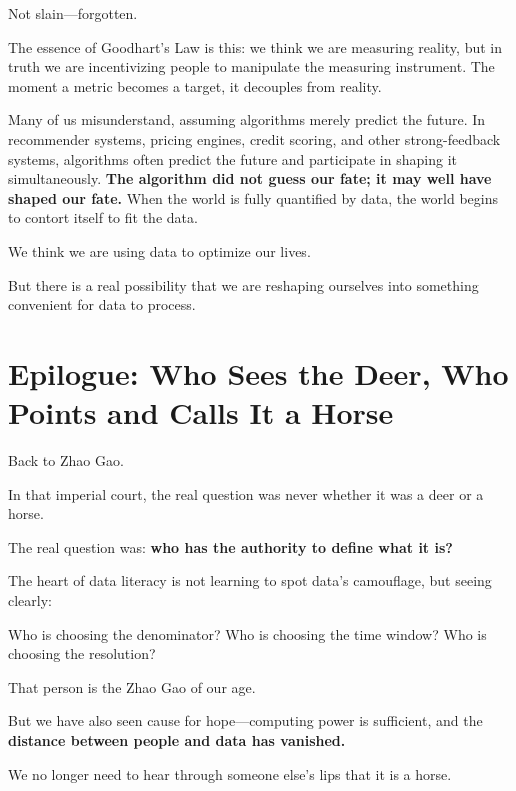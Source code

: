 \vspace{1em}

Not slain---forgotten.

The essence of Goodhart's Law is this: we think we are measuring reality, but in truth we are incentivizing people to manipulate the measuring instrument.
The moment a metric becomes a target, it decouples from reality.

\vspace{1em}

Many of us misunderstand, assuming algorithms merely predict the future.
In recommender systems, pricing engines, credit scoring, and other strong-feedback systems, algorithms often predict the future and participate in shaping it simultaneously.
\textbf{The algorithm did not guess our fate; it may well have shaped our fate.}
When the world is fully quantified by data, the world begins to contort itself to fit the data.

\begin{thinkbox}
We think we are using data to optimize our lives.

But there is a real possibility that we are reshaping ourselves into something convenient for data to process.
\end{thinkbox}

\newpage
\section{Epilogue: Who Sees the Deer, Who Points and Calls It a Horse}

Back to Zhao Gao.

In that imperial court, the real question was never whether it was a deer or a horse.

The real question was: \textbf{who has the authority to define what it is?}

The heart of data literacy is not learning to spot data's camouflage, but seeing clearly:

Who is choosing the denominator? Who is choosing the time window? Who is choosing the resolution?

That person is the Zhao Gao of our age.

\vspace{1em}

But we have also seen cause for hope---computing power is sufficient, and the \textbf{distance between people and data has vanished.}

We no longer need to hear through someone else's lips that it is a horse.


